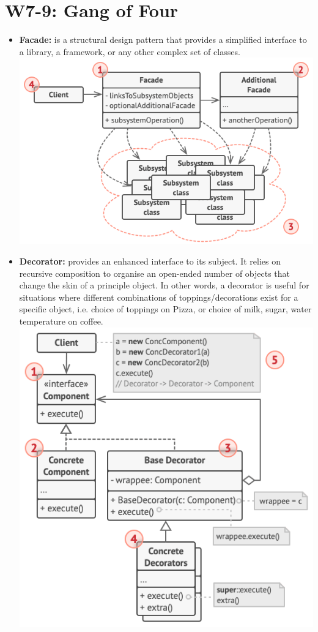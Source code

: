 \section{W7-9: Gang of Four}
\begin{itemize}
    \item \textbf{Facade:} is a structural design pattern that provides a simplified interface to a library, a framework, or any other complex set of classes.\\
    \includegraphics[width=\linewidth]{figs/facade.png}\\
    \item \textbf{Decorator:} provides an enhanced interface to its subject. It relies on recursive composition to organise an open-ended number of objects that change the skin of a principle object. In other words, a decorator is useful for situations where different combinations of toppings/decorations exist for a specific object, i.e. choice of toppings on Pizza, or choice of milk, sugar, water temperature on coffee.\\
    \includegraphics[width=\linewidth]{figs/decorator.png}\\

\end{itemize}
